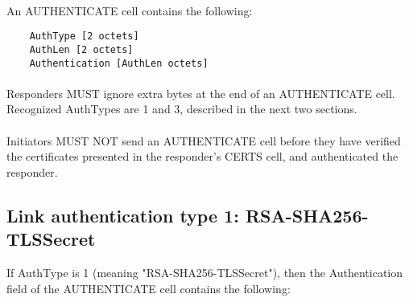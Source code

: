 \paragraph{}
An AUTHENTICATE cell contains the following:
\begin{verbatim}
    AuthType [2 octets]
    AuthLen [2 octets]
    Authentication [AuthLen octets]
\end{verbatim}

\paragraph{}
Responders MUST ignore extra bytes at the end of an AUTHENTICATE
cell. Recognized AuthTypes are 1 and 3, described in the next
two sections.

\paragraph{}
Initiators MUST NOT send an AUTHENTICATE cell before they have
verified the certificates presented in the responder's CERTS
cell, and authenticated the responder.

\subsection{Link authentication type 1: RSA-SHA256-TLSSecret}

If AuthType is 1 (meaning "RSA-SHA256-TLSSecret"), then the
Authentication field of the AUTHENTICATE cell contains the following:

